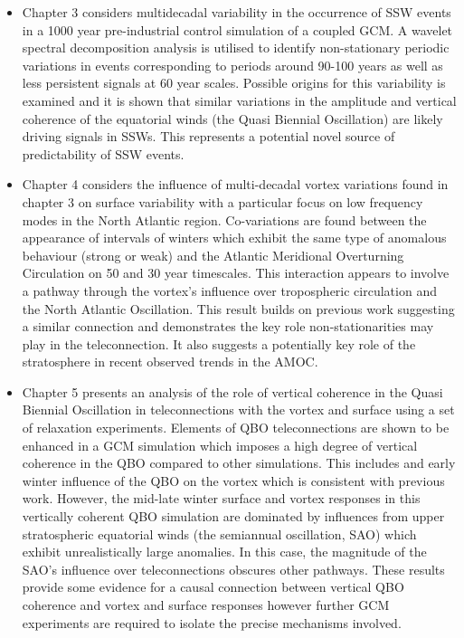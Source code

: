 \begin{itemize}
    \item Chapter 3 considers multidecadal variability in the occurrence of SSW events in a 1000 year pre-industrial control simulation of a coupled GCM. A wavelet spectral decomposition analysis is utilised to identify non-stationary periodic variations in events corresponding to periods around 90-100 years as well as less persistent signals at 60 year scales. Possible origins for this variability is examined and it is shown that similar variations in the amplitude and vertical coherence of the equatorial winds (the Quasi Biennial Oscillation) are likely driving signals in SSWs. This represents a potential novel source of predictability of SSW events.
    
    \item Chapter 4 considers the influence of multi-decadal vortex variations found in chapter 3 on surface variability with a particular focus on low frequency modes in the North Atlantic region. Co-variations are found between the appearance of intervals of winters which exhibit the same type of anomalous behaviour (strong or weak) and the Atlantic Meridional Overturning Circulation on 50 and 30 year timescales. This interaction appears to involve a pathway through the vortex's influence over tropospheric circulation and the North Atlantic Oscillation. This result builds on previous work suggesting a similar connection and demonstrates the key role non-stationarities may play in the teleconnection. It also suggests a potentially key role of the stratosphere in recent observed trends in the AMOC. 
    
    \item Chapter 5 presents an analysis of the role of vertical coherence in the Quasi Biennial Oscillation in teleconnections with the vortex and surface using a set of relaxation experiments. Elements of QBO teleconnections are shown to be enhanced in a GCM simulation which imposes a high degree of vertical coherence in the QBO compared to other simulations. This includes and early winter influence of the QBO on the vortex which is consistent with previous work. However, the mid-late winter surface and vortex responses in this vertically coherent QBO simulation are dominated by influences from upper stratospheric equatorial winds (the semiannual oscillation, SAO) which exhibit unrealistically large anomalies. In this case, the magnitude of the SAO's influence over teleconnections obscures other pathways. These results provide some evidence for a causal connection between vertical QBO coherence and vortex and surface responses however further GCM experiments are required to isolate the precise mechanisms involved.  
\end{itemize}


